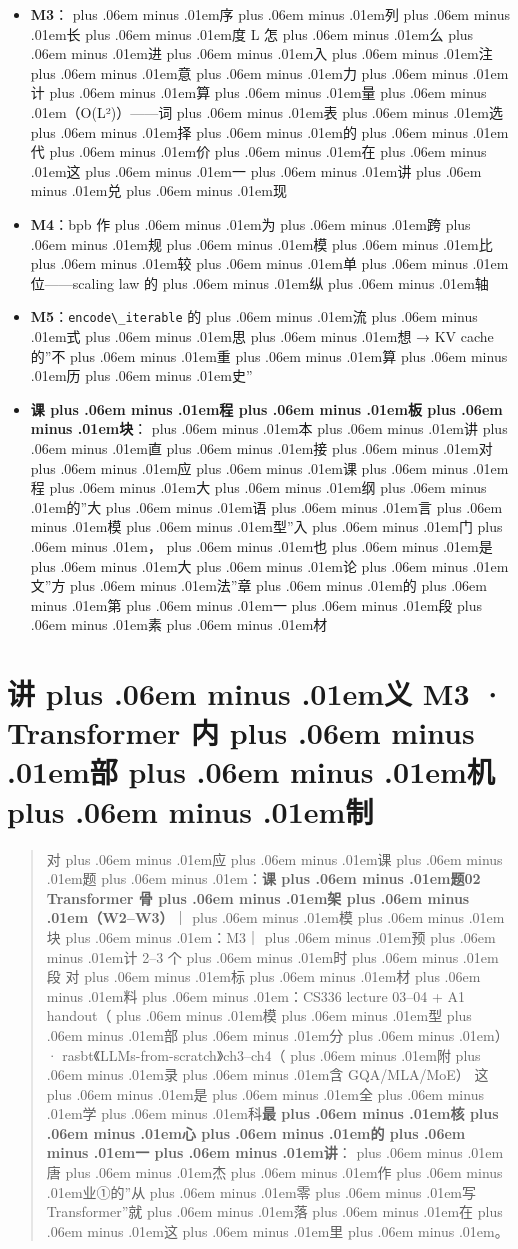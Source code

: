 \documentclass[
]{article}
\newcommand{\passthrough}[1]{#1}
\providecommand{\tightlist}{%
  \setlength{\itemsep}{0pt}\setlength{\parskip}{0pt}}
\def\zh#1{{\zhfont #1}}
\def\sym#1{{\symfont #1}}
\def\zhglue{\hskip0pt plus .06em minus .01em}
\begin{document}
\begin{itemize}
\tightlist
\item
  \textbf{M3}\zh{：\zhglue 序\zhglue 列\zhglue 长\zhglue 度} L \zh{怎\zhglue 么\zhglue 进\zhglue 入\zhglue 注\zhglue 意\zhglue 力\zhglue 计\zhglue 算\zhglue 量\zhglue （}O(L\sym{²})\zh{）}------\zh{词\zhglue 表\zhglue 选\zhglue 择\zhglue 的\zhglue 代\zhglue 价\zhglue 在\zhglue 这\zhglue 一\zhglue 讲\zhglue 兑\zhglue 现}
\item
  \textbf{M4}\zh{：}bpb \zh{作\zhglue 为\zhglue 跨\zhglue 规\zhglue 模\zhglue 比\zhglue 较\zhglue 单\zhglue 位}------scaling law \zh{的\zhglue 纵\zhglue 轴}
\item
  \textbf{M5}\zh{：}\passthrough{\lstinline!encode\_iterable!} \zh{的\zhglue 流\zhglue 式\zhglue 思\zhglue 想} \sym{→} KV cache \zh{的}''\zh{不\zhglue 重\zhglue 算\zhglue 历\zhglue 史}''
\item
  \textbf{\zh{课\zhglue 程\zhglue 板\zhglue 块}}\zh{：\zhglue 本\zhglue 讲\zhglue 直\zhglue 接\zhglue 对\zhglue 应\zhglue 课\zhglue 程\zhglue 大\zhglue 纲\zhglue 的}''\zh{大\zhglue 语\zhglue 言\zhglue 模\zhglue 型}''\zh{入\zhglue 门\zhglue ，\zhglue 也\zhglue 是\zhglue 大\zhglue 论\zhglue 文}''\zh{方\zhglue 法}''\zh{章\zhglue 的\zhglue 第\zhglue 一\zhglue 段\zhglue 素\zhglue 材}
\end{itemize}

\newpage

\section{\zh{讲\zhglue 义} M3 \sym{·} Transformer \zh{内\zhglue 部\zhglue 机\zhglue 制}}\label{ux8bb2ux4e49-m3-transformer-ux5185ux90e8ux673aux5236}

\begin{quote}
\zh{对\zhglue 应\zhglue 课\zhglue 题\zhglue ：}\textbf{\zh{课\zhglue 题}02 Transformer \zh{骨\zhglue 架\zhglue （}W2--W3\zh{）}}\zh{｜\zhglue 模\zhglue 块\zhglue ：}M3\zh{｜\zhglue 预\zhglue 计} 2--3 \zh{个\zhglue 时\zhglue 段} \zh{对\zhglue 标\zhglue 材\zhglue 料\zhglue ：}CS336 lecture 03--04 + A1 handout\zh{（\zhglue 模\zhglue 型\zhglue 部\zhglue 分\zhglue ）}\sym{·} rasbt\zh{《}LLMs-from-scratch\zh{》}ch3--ch4\zh{（\zhglue 附\zhglue 录\zhglue 含} GQA/MLA/MoE\zh{）} \zh{这\zhglue 是\zhglue 全\zhglue 学\zhglue 科}\textbf{\zh{最\zhglue 核\zhglue 心\zhglue 的\zhglue 一\zhglue 讲}}\zh{：\zhglue 唐\zhglue 杰\zhglue 作\zhglue 业}\sym{①}\zh{的}''\zh{从\zhglue 零\zhglue 写} Transformer''\zh{就\zhglue 落\zhglue 在\zhglue 这\zhglue 里\zhglue 。}
\end{quote}
\end{document}
